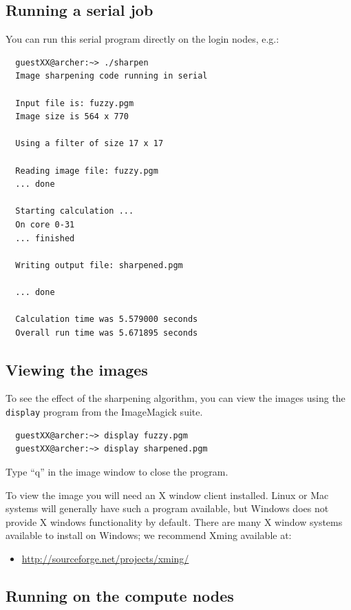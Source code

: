 \documentclass{article}
\begin{document}
\subsection{Running a serial job}

You can run this serial program directly on the login nodes, e.g.:

\begin{verbatim}
  guestXX@archer:~> ./sharpen
  Image sharpening code running in serial

  Input file is: fuzzy.pgm
  Image size is 564 x 770

  Using a filter of size 17 x 17

  Reading image file: fuzzy.pgm
  ... done

  Starting calculation ...
  On core 0-31
  ... finished

  Writing output file: sharpened.pgm

  ... done

  Calculation time was 5.579000 seconds
  Overall run time was 5.671895 seconds
\end{verbatim}

\subsection{Viewing the images}

To see the effect of the sharpening algorithm, you can view the images
using the {\verb+display+} program from the ImageMagick suite.

\begin{verbatim}
  guestXX@archer:~> display fuzzy.pgm
  guestXX@archer:~> display sharpened.pgm
\end{verbatim}

Type ``q'' in the image window to close the program.

To view the image you will need an X window client installed.  Linux
or Mac systems will generally have such a program available, but
Windows does not provide X windows functionality by default.  There
are many X window systems available to install on Windows; we
recommend Xming available at:

\begin{itemize}
\item \href{http://sourceforge.net/projects/xming/}{http://sourceforge.net/projects/xming/}
\end{itemize}

\subsection{Running on the compute nodes}
\label{sec-3-7}
\end{document}
